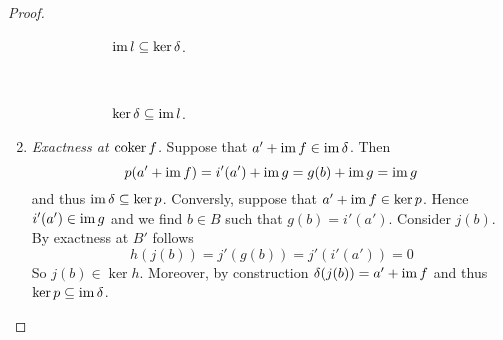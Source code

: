 \begin{proof}
\begin{enumerate}[label = \textit{Step \arabic*:},wide = 0pt]
			\begin{figure}[h!tb]
				\centering
				\begin{subfigure}[b]{.5\textwidth}
					\caption{$\operatorname{im} l \subseteq \ker \delta$.}
					\label{fig:im_l_subseteq_ker_delta}
				\end{subfigure}
				~
				\begin{subfigure}[b]{.5\textwidth}
					\caption{$\ker \delta \subseteq \operatorname{im} l$.}
					\label{fig:ker_delta_subseteq_im_l}					
				\end{subfigure}
				\caption{}
			\end{figure}

		\item \textit{Exactness at $\operatorname{coker} f$.} Suppose that $a' + \operatorname{im} f \in \operatorname{im} \delta$. Then
			\begin{equation*}
				p(a' + \operatorname{im} f) = i'(a') + \operatorname{im} g = g(b) + \operatorname{im} g = \operatorname{im} g 
			\end{equation*}
			\noindent and thus $\operatorname{im} \delta \subseteq \ker p$. Conversly, suppose that $a' + \operatorname{im} f \in \ker p$. Hence $i'(a') \in \operatorname{im} g$ and we find $b \in B$ such that $g(b) = i'(a')$. Consider $j(b)$. By exactness at $B'$ follows
			\begin{equation*}
				h(j(b)) = j'(g(b)) = j'(i'(a')) = 0
			\end{equation*}
			So $j(b) \in \ker h$. Moreover, by construction $\delta(j(b)) = a' + \operatorname{im} f$ and thus $\ker p \subseteq \operatorname{im} \delta$.
	\end{enumerate}
\end{proof}
